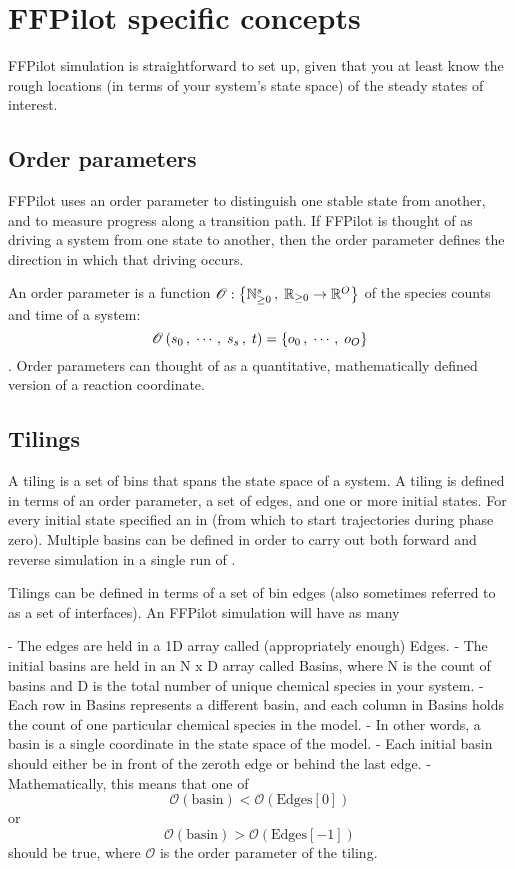 \section{FFPilot specific concepts}

FFPilot simulation is straightforward to set up, given that you at least know the rough locations (in terms of your system's state space) of the steady states of interest.

\subsection{Order parameters}

FFPilot uses an order parameter to distinguish one stable state from another, and to measure progress along a transition path. If FFPilot is thought of as driving a system from one state to another, then the order parameter defines the direction in which that driving occurs.

An order parameter is a function $\mathscr{O}: \left\{ {\mathbb{N}}_{\geq 0}^s \,, \; {\mathbb{R}}_{\geq 0} \rightarrow \mathbb{R}^O \right\}$ of the species counts  and time of a system:
\begin{equation*}
    \mathscr{O} \left( s_{0} \,, \; \cdots \,, \; s_{s} \,, \; t \right) = \left\{ o_0 \,, \; \cdots \,, \; o_{O} \right\}
\end{equation*}. 
Order parameters can thought of as a quantitative, mathematically defined version of a reaction coordinate.

\subsection{Tilings}
A tiling is a set of bins that spans the state space of a system. A tiling is defined in terms of an order parameter, a set of edges, and one or more initial states. For every initial state specified an in (from which to start trajectories during phase zero). Multiple basins can be defined in order to carry out both forward and reverse simulation in a single run of .

Tilings can be defined in terms of a set of bin edges (also sometimes referred to as a set of interfaces). An FFPilot simulation will have as many 


- The edges are held in a 1D array called (appropriately enough) Edges.
- The initial basins are held in an N x D array called Basins, where N is the count of basins and D is the total number of unique chemical species in your system.
    - Each row in Basins represents a different basin, and each column in Basins holds the count of one particular chemical species in the model.
        - In other words, a basin is a single coordinate in the state space of the model.
    - Each initial basin should either be in front of the zeroth edge or behind the last edge.
        - Mathematically, this means that one of $$ \mathscr{O}(\text{basin}) < \mathscr{O}(\text{Edges}[0]) $$ or $$ \mathscr{O}(\text{basin}) > \mathscr{O}(\text{Edges}[-1]) $$ should be true, where $\mathscr{O}$ is the order parameter of the tiling.

